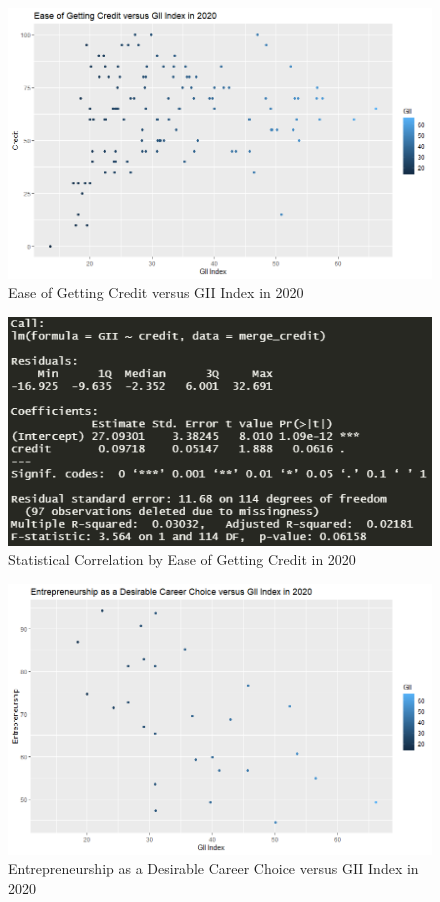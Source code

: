 \documentclass[15pt]{article}
\begin{document}
\begin{figure}[H]
    \centering
    \includegraphics[scale = 0.7]{Part5_Credit.png}
    \caption{Ease of Getting Credit versus GII Index in 2020}
\end{figure}

\begin{figure}[H]
    \centering
    \includegraphics[scale = 0.7]{Part5_Credit_r^2.PNG}
    \caption{Statistical Correlation by Ease of Getting Credit in 2020}
\end{figure}

\begin{figure}[H]
    \centering
    \includegraphics[scale = 0.7]{Part5_Entrepreneurship.png}
    \caption{Entrepreneurship as a Desirable Career Choice versus GII Index in 2020}
\end{figure}
\end{document}
